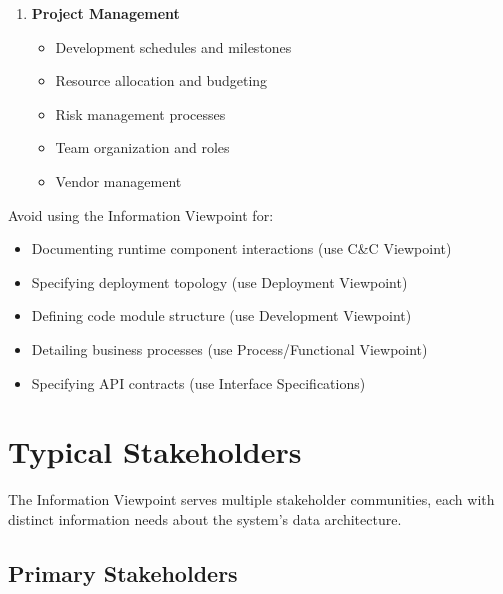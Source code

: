 \documentclass[11pt,letterpaper]{article}
\begin{document}
\begin{enumerate}[label=\textbf{AC\arabic*:}, leftmargin=2.5em]
    \item \textbf{Project Management}
    \begin{itemize}[nosep]
        \item Development schedules and milestones
        \item Resource allocation and budgeting
        \item Risk management processes
        \item Team organization and roles
        \item Vendor management
    \end{itemize}
\end{enumerate}

\begin{warningbox}
Avoid using the Information Viewpoint for:

\begin{itemize}[nosep]
    \item Documenting runtime component interactions (use C\&C Viewpoint)
    \item Specifying deployment topology (use Deployment Viewpoint)
    \item Defining code module structure (use Development Viewpoint)
    \item Detailing business processes (use Process/Functional Viewpoint)
    \item Specifying API contracts (use Interface Specifications)
\end{itemize}
\end{warningbox}

\section{Typical Stakeholders}

The Information Viewpoint serves multiple stakeholder communities, each with distinct information needs about the system's data architecture.

\subsection{Primary Stakeholders}
\end{document}
